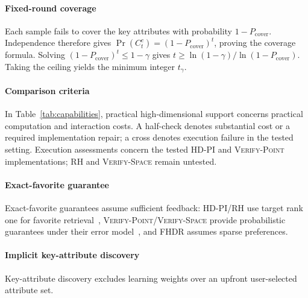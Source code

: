\paragraph{Fixed-round coverage}
Each sample fails to cover the key attributes with probability $1-P_\text{cover}$. Independence therefore gives $\Pr(C_t^c)=(1-P_\text{cover})^t$, proving the coverage formula. Solving $(1-P_\text{cover})^t\leq1-\gamma$ gives $t\geq\ln(1-\gamma)/\ln(1-P_\text{cover})$. Taking the ceiling yields the minimum integer $t_\gamma$.

\iftoggle{TechnicalReport}
  {\section{Capability Qualifications and Reproduction Results}}
  {\section{Capability Qualifications}}
\label{appen:capabilities}

\paragraph{Comparison criteria}
In Table~\ref{tab:capabilities}, practical high-dimensional support concerns practical computation and interaction costs. A half-check denotes substantial cost or a required implementation repair; a cross denotes execution failure in the tested setting. Execution assessments concern the tested \textsc{HD-PI} and \textsc{Verify-Point} implementations; \textsc{RH} and \textsc{Verify-Space} remain untested.

\paragraph{Exact-favorite guarantee}
Exact-favorite guarantees assume sufficient feedback: \textsc{HD-PI}/\textsc{RH} use target rank one for favorite retrieval~\cite{WWX21}, \textsc{Verify-Point}/\textsc{Verify-Space} provide probabilistic guarantees under their error model~\cite{CW23}, and FHDR assumes sparse preferences.

\paragraph{Implicit key-attribute discovery}
Key-attribute discovery excludes learning weights over an upfront user-selected attribute set.

